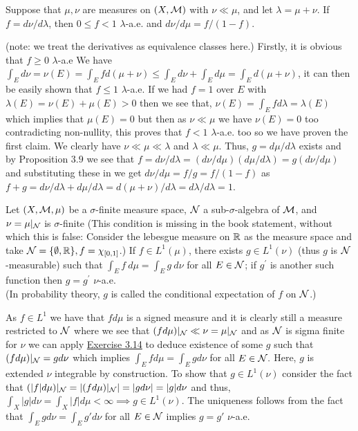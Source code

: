 \documentclass[12pt,a4paper]{article}
\begin{document}
\begin{problem}\label{prob:3-16}
Suppose that $\mu, \nu$ are measures on $(X, \mathcal{M})$ with $\nu\ll\mu$, and let $\lambda=\mu+\nu$. If $f=d\nu/d\lambda$, then $0\le f<1$ $\lambda$-a.e. and $d\nu/d\mu=f/(1-f)$.
\end{problem}
\begin{solution}
(note: we treat the derivatives as equivalence classes here.) Firstly, it is obvious that $f\geq 0$ $\lambda$-a.e We have $\int_Ed\nu=\nu(E)=\int_Efd(\mu+\nu)\leq\int_Ed\nu+\int_Ed\mu=\int_E d(\mu+\nu)$, it can then be easily shown that $f\leq 1$ $\lambda$-a.e. 
If we had $f=1$ over $E$ with $\lambda(E)=\nu(E)+\mu(E)>0$ then we see that, $\nu(E)=\int_Efd\lambda=\lambda(E)$ which implies that $\mu(E)=0$ but then as $\nu\ll\mu$ we have $\nu(E)=0$ too contradicting non-nullity, this proves that $f<1$ $\lambda$-a.e. too so we have proven the first claim. 
We clearly have $\nu\ll\mu\ll\lambda$ and $\lambda\ll\mu$.
Thus, $g=d\mu/d\lambda$ exists and by Proposition $3.9$ we see that $f=d\nu/d\lambda=(d\nu/d\mu)(d\mu/d\lambda)=g(d\nu/d\mu)$ and substituting these in we get $d\nu/d\mu=f/g=f/(1-f)$ as $f+g=d\nu/d\lambda+d\mu/d\lambda=d(\mu+\nu)/d\lambda=d\lambda/d\lambda=1.$
\end{solution}
\begin{problem}\label{prob:3-17}
	Let $(X, \mathcal{M}, \mu)$ be a $\sigma$-finite measure space, $\mathcal{N}$ a sub-$\sigma$-algebra of $\mathcal{M}$, and $\nu=\mu|_{\mathcal{N}}$ is $\sigma$-finite (This condition is missing in the book statement, without which this is false: Consider the lebesgue measure on $\mathbb{R}$ as the measure space and take $\mathcal{N}=\{\emptyset,\mathbb{R}\}, f=\chi_{[0,1]}$.) If $f\in L^{1}(\mu)$, there exists $g\in L^{1}(\nu)$ (thus $g$ is $\mathcal{N}$-measurable) such that $\int_{E}f~d\mu=\int_{E}g~d\nu$ for all $E\in\mathcal{N}$; if $g^{\prime}$ is another such function then $g=g^{\prime}$ $\nu$-a.e. \\
(In probability theory, $g$ is called the conditional expectation of $f$ on $\mathcal{N}$.)
\end{problem}
\begin{solution}
	As $f\in L^1$ we have that $fd\mu$ is a signed measure and it is clearly still a measure restricted to $\mathcal{N}$ where we see that $(fd\mu)|_{\mathcal{N}}\ll\nu=\mu|_{\mathcal{N}}$ and as $\mathcal{N}$ is sigma finite for $\nu$ we can apply \hyperref[prob:3-14]{Exercise 3.14} to deduce existence of some $g$ such that $(fd\mu)|_{\mathcal{N}}=gd\nu$ which implies $\int_Efd\mu=\int_Egd\nu$ for all $E\in\mathcal{N}.$ 
    Here, $g$ is extended $\nu$ integrable by construction. 
    To show that $g\in L^1(\nu)$ consider the fact that $(|f|d\mu)|_{\mathcal{N}}=|(fd\mu)|_{\mathcal{N}}|=|gd\nu|=|g|d\nu$ and thus, $\int_X|g|d\nu=\int_X|f|d\mu<\infty\implies g\in L^1(\nu)$. 
    The uniqueness follows from the fact that $\int_Egd\nu=\int_Eg'd\nu$ for all $E\in\mathcal{N}$ implies $g=g'$ $\nu$-a.e.
\end{solution}
\end{document}
